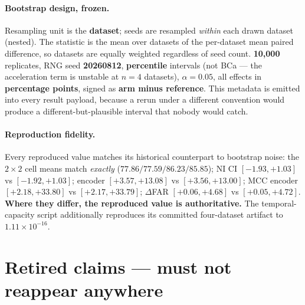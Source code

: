 \paragraph{Bootstrap design, frozen.} Resampling unit is the \textbf{dataset}; seeds are
resampled \emph{within} each drawn dataset (nested). The statistic is the mean over
datasets of the per-dataset mean paired difference, so datasets are equally weighted
regardless of seed count. \textbf{10{,}000} replicates, RNG seed \textbf{20260812},
\textbf{percentile} intervals (not BCa --- the acceleration term is unstable at $n=4$
datasets), $\alpha=0.05$, all effects in \textbf{percentage points}, signed as
\textbf{arm minus reference}. This metadata is emitted into every result payload, because
a rerun under a different convention would produce a different-but-plausible interval
that nobody would catch.

\paragraph{Reproduction fidelity.} Every reproduced value matches its historical
counterpart to bootstrap noise: the $2\times2$ cell means match \emph{exactly}
($77.86/77.59/86.23/85.85$); NI CI $[-1.93,+1.03]$ vs $[-1.92,+1.03]$; encoder
$[+3.57,+13.08]$ vs $[+3.56,+13.00]$; MCC encoder $[+2.18,+33.80]$ vs $[+2.17,+33.79]$;
$\Delta$FAR $[+0.06,+4.68]$ vs $[+0.05,+4.72]$. \textbf{Where they differ, the reproduced
value is authoritative.} The temporal-capacity script additionally reproduces its
committed four-dataset artifact to $1.11\times10^{-16}$.

\section*{Retired claims --- must not reappear anywhere}

